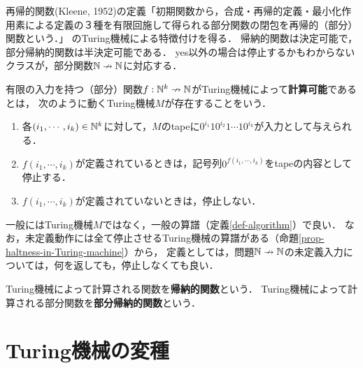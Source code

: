 \documentclass[uplatex, dvipdfmx]{jsreport}
\begin{document}
\begin{tcolorbox}[colframe=ForestGreen, colback=ForestGreen!10!white, breakable]
    再帰的関数(Kleene, 1952)の定義「初期関数から，合成・再帰的定義・最小化作用素による定義の３種を有限回施して得られる部分関数の閉包を再帰的（部分）関数という．」
    のTuring機械による特徴付けを得る．
    帰納的関数は決定可能で，部分帰納的関数は半決定可能である．
    yes以外の場合は停止するかもわからないクラスが，部分関数$\mathbb{N}\nrightarrow\mathbb{N}$に対応する．
\end{tcolorbox}

\begin{definition}
    有限の入力を持つ（部分）関数$f:\mathbb{N}^k\nrightarrow\mathbb{N}$がTuring機械によって\textbf{計算可能}であるとは，
    次のように動くTuring機械$M$が存在することをいう．
    \begin{enumerate}
        \item 各$(i_1,\cdots,i_k)\in\mathbb{N}^k$に対して，$M$のtapeに$0^{i_1}10^{i_2}1\cdots 10^{i_k}$が入力として与えられる．
        \item $f(i_1,\cdots,i_k)$が定義されているときは，記号列$0^{f(i_1,\cdots,i_k)}$をtapeの内容として停止する．
        \item $f(i_1,\cdots,i_k)$が定義されていないときは，停止しない．
    \end{enumerate}
\end{definition}
\begin{remark}
    一般にはTuring機械$M$ではなく，一般の算譜（定義\ref{def-algorithm}）で良い．
    なお，未定義動作には全て停止させるTuring機械の算譜がある（命題\ref{prop-haltness-in-Turing-machine}）から，
    定義としては，問題$\mathbb{N}\nrightarrow\mathbb{N}$の未定義入力については，何を返しても，停止しなくても良い．
\end{remark}

\begin{definition}
    Turing機械によって計算される関数を\textbf{帰納的関数}という．
    Turing機械によって計算される部分関数を\textbf{部分帰納的関数}という．
\end{definition}

\section{Turing機械の変種}
\end{document}
